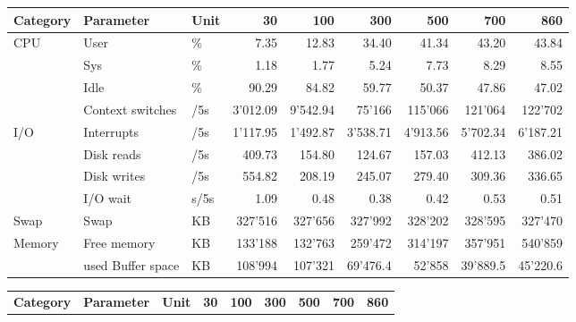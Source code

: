 \begin{table}[tbp]
\begin{center}	
\begin{minipage}{\textwidth}
\begin{center}
\begin{tabular}{l|l|l|r|r|r|r|r|r }
\textbf{Category} & \textbf{Parameter} & \textbf{Unit} & \textbf{30} & \textbf{100} & \textbf{300} & \textbf{500} & \textbf{700} & \textbf{860} \\
\hline
CPU & User & \%             & 7.35 & 12.83      & 34.40     & 41.34     & 43.20     & 43.84 \\
    & Sys  & \%             & 1.18 & 1.77       & 5.24  & 7.73      & 8.29      & 8.55 \\
    & Idle & \%             & 90.29 & 84.82         & 59.77 & 50.37         & 47.86         & 47.02 \\
    & Context switches & /5s  & 3'012.09 & 9'542.94 & 75'166 & 115'066  & 121'064   & 122'702 \\
\hline
I/O & Interrupts & /5s       & 1'117.95     & 1'492.87  & 3'538.71  & 4'913.56  & 5'702.34  & 6'187.21 \\
    & Disk reads   & /5s     & 409.73   & 154.80    & 124.67    & 157.03    & 412.13        & 386.02 \\
    & Disk writes   & /5s    & 554.82   & 208.19    & 245.07    & 279.40    & 309.36    & 336.65 \\
    & I/O wait     & s/5s       & 1.09      & 0.48      & 0.38      & 0.42      & 0.53      & 0.51 \\
\hline
Swap & Swap   & KB          & 327'516 & 327'656 & 327'992 & 328'202 & 328'595 & 327'470 \\
\hline
Memory & Free memory  & KB          & 133'188 & 132'763 & 259'472 & 314'197 & 357'951 & 540'859 \\
       & used Buffer space  & KB    & 108'994 & 107'321 & 69'476.4 & 52'858 & 39'889.5 & 45'220.6 \\
\end{tabular}
\vspace{5mm}
\end{center}
\end{minipage}
\begin{minipage}{\textwidth}
\begin{center}
\begin{tabular}{l|l|l|r|r|r|r|r|r }
\textbf{Category} & \textbf{Parameter} & \textbf{Unit} & \textbf{30} & \textbf{100} & \textbf{300} & \textbf{500} & \textbf{700} & \textbf{860} \\

\end{tabular}
\end{center}
\end{minipage}
\end{center}
\end{table}
